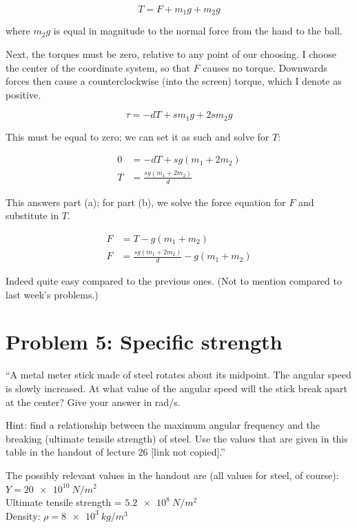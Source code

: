 \documentclass[8.01x]{subfiles}
\begin{document}
\begin{equation}
T = F + m_1 g + m_2 g
\end{equation}

where $m_2 g$ is equal in magnitude to the normal force from the hand to the ball.

Next, the torques must be zero, relative to any point of our choosing. I choose the center of the coordinate system, so that $F$ causes no torque. Downwards forces then cause a counterclockwise (into the screen) torque, which I denote as positive.

\begin{equation}
\tau = - d T + s m_1 g + 2 s m_2 g
\end{equation}

This must be equal to zero; we can set it as such and solve for $T$:

\begin{align}
0 &= - d T + s g ( m_1 + 2 m_2)\\
T &= \frac{s g (m_1 + 2 m_2)}{d}
\end{align}

This answers part (a); for part (b), we solve the force equation for $F$ and substitute in $T$.

\begin{align}
F &= T - g(m_1 + m_2)\\
F &= \frac{s g (m_1 + 2 m_2)}{d} - g(m_1 + m_2)
\end{align}

Indeed quite easy compared to the previous ones. (Not to mention compared to last week's problems.)

\section{Problem 5: Specific strength}

``A metal meter stick made of steel rotates about its midpoint. The angular speed is slowly increased. At what value of the angular speed will the stick break apart at the center? Give your answer in rad/s.

Hint: find a relationship between the maximum angular frequency and the breaking (ultimate tensile strength) of steel. Use the values that are given in this table in the handout of lecture 26 [link not copied].''

The possibly relevant values in the handout are (all values for steel, of course):\\
$Y = \SI{20e10}{N/m^2}$\\
Ultimate tensile strength = $\SI{5.2e8}{N/m^2}$\\
Density: $\rho = \SI{8e3}{kg/m^3}$
\end{document}
